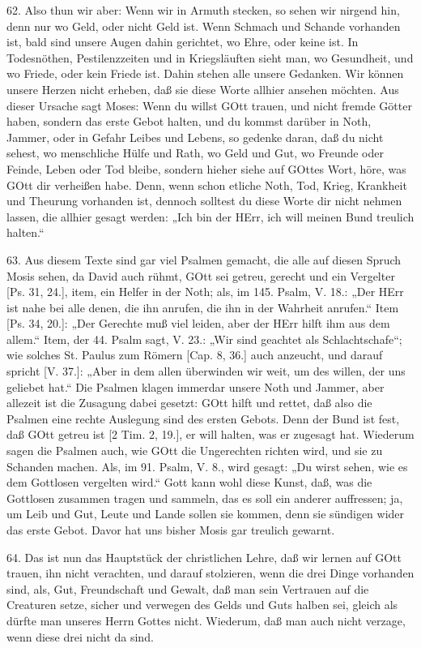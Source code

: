 62. Also thun wir aber: Wenn wir in Armuth stecken, so sehen wir nirgend hin, denn nur wo Geld, oder nicht Geld ist. Wenn Schmach und Schande vorhanden ist, bald sind unsere Augen dahin gerichtet, wo Ehre, oder keine ist. In Todesnöthen, Pestilenzzeiten und in Kriegsläuften sieht man, wo Gesundheit, und wo Friede, oder kein Friede ist. Dahin stehen alle unsere Gedanken. Wir können unsere Herzen nicht erheben, daß sie diese Worte allhier ansehen möchten. Aus dieser Ursache sagt Moses: Wenn du willst GOtt trauen, und nicht fremde Götter haben, sondern das erste Gebot halten, und du kommst darüber in Noth, Jammer, oder in Gefahr Leibes und Lebens, so gedenke daran, daß du nicht sehest, wo menschliche Hülfe und Rath, wo Geld und Gut, wo Freunde oder Feinde, Leben oder Tod bleibe, sondern hieher siehe auf GOttes Wort, höre, was GOtt dir verheißen habe. Denn, wenn schon etliche Noth, Tod, Krieg, Krankheit und Theurung vorhanden ist, dennoch solltest du diese Worte dir nicht nehmen lassen, die allhier gesagt werden: „Ich bin der HErr, ich will meinen Bund treulich halten.“

63. Aus diesem Texte sind gar viel Psalmen gemacht, die alle auf diesen Spruch Mosis sehen, da David auch rühmt, GOtt sei getreu, gerecht und ein Vergelter [Ps. 31, 24.], item, ein Helfer in der Noth; als, im 145. Psalm, V. 18.: „Der HErr ist nahe bei alle denen, die ihn anrufen, die ihn in der Wahrheit anrufen.“ Item [Ps. 34, 20.]: „Der Gerechte muß viel leiden, aber der HErr hilft ihm aus dem allem.“ Item, der 44. Psalm sagt, V. 23.: „Wir sind geachtet als Schlachtschafe“; wie solches St. Paulus zum Römern [Cap. 8, 36.] auch anzeucht, und darauf spricht [V. 37.]: „Aber in dem allen überwinden wir weit, um des willen, der uns geliebet hat.“ Die Psalmen klagen immerdar unsere Noth und Jammer, aber allezeit ist die Zusagung dabei gesetzt: GOtt hilft und rettet, daß also die Psalmen eine rechte Auslegung sind des ersten Gebots. Denn der Bund ist fest, daß GOtt getreu ist [2 Tim. 2, 19.], er will halten, was er zugesagt hat. Wiederum sagen die Psalmen auch, wie GOtt die Ungerechten richten wird, und sie zu Schanden machen. Als, im 91. Psalm, V. 8., wird gesagt: „Du wirst sehen, wie es dem Gottlosen vergelten wird.“ Gott kann wohl diese Kunst, daß, was die Gottlosen zusammen tragen und sammeln, das es soll ein anderer auffressen; ja, um Leib und Gut, Leute und Lande sollen sie kommen, denn sie sündigen wider das erste Gebot. Davor hat uns bisher Mosis gar treulich gewarnt.

64. Das ist nun das Hauptstück der christlichen Lehre, daß wir lernen auf GOtt trauen, ihn nicht verachten, und darauf stolzieren, wenn die drei Dinge vorhanden sind, als, Gut, Freundschaft und Gewalt, daß man sein Vertrauen auf die Creaturen setze, sicher und verwegen des Gelds und Guts halben sei, gleich als dürfte man unseres Herrn Gottes nicht. Wiederum, daß man auch nicht verzage, wenn diese drei nicht da sind.


